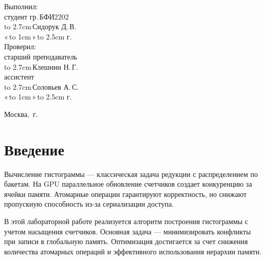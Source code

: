 \documentclass[14pt]{extarticle}
\makeatletter
\newcommand{\hrf}[1]{\hbox to #1{\hrulefill}} %
\newcounter{sectionc} %
\newcommand{\numbersections}{\renewcommand{\Hy@numberline}[1]{##1~}}
\newcommand{\nonumbersections}{\renewcommand{\Hy@numberline}[1]{}}
\let\oldsection\section
\renewcommand{\section}{\numbersections\oldsection}
\let\oldsectionc\sectionc
\renewcommand{\sectionc}{\nonumbersections\oldsectionc}
\renewcommand\tableofcontents{
	\pdfbookmark[sectionc]{\contentsname}{toc} %
	\sectionc*{\contentsname
		\@mkboth{\contentsname}{\contentsname}}
	\@starttoc{toc}
}
\makeatother
\begin{document}
\vfill %

\hfill %
\begin{minipage}{0.45\textwidth} %
	Выполнил:\\[2mm]
	студент гр.\,БФИ2202\\[2mm]
	\hrf{2.7cm}\,Сидорук Д.\,В.\\[2mm]
	«\,\hrf{1cm}\,»\,\hrf{2.5cm}\,\the\year{}\,г.\\[5mm]
	
	Проверил:\\[2mm]
	старший преподаватель\\[2mm]
	\hrf{2.7cm}\,Клешнин Н.\,Г.\\[2mm]
	ассистент\\[2mm]
	\hrf{2.7cm}\,Соловьев А.\,С.\\[2mm]
	«\,\hrf{1cm}\,»\,\hrf{2.5cm}\,\the\year{}\,г.
\end{minipage}%

\vfill

\centerline{Москва, \the\year{}\,г.} %
\thispagestyle{empty} %
\newpage %
\tableofcontents %
\newpage %

\section{Введение}

Вычисление гистограммы — классическая задача редукции с распределением по бакетам. На GPU параллельное обновление счетчиков создает конкуренцию за ячейки памяти. Атомарные операции гарантируют корректность, но снижают пропускную способность из-за сериализации доступа.

В этой лабораторной работе реализуется алгоритм построения гистограммы с учетом насыщения счетчиков. Основная задача — минимизировать конфликты при записи в глобальную память. Оптимизация достигается за счет снижения количества атомарных операций и эффективного использования иерархии памяти.
\end{document}
